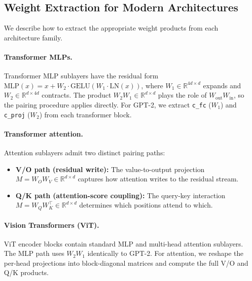 \documentclass[wcp]{jmlr}
\begin{document}
\subsection{Weight Extraction for Modern Architectures}\label{sec:architectures}

We describe how to extract the appropriate weight products from each architecture family.

\paragraph{Transformer MLPs.} Transformer MLP sublayers have the residual form $\mathrm{MLP}(x) = x + W_2 \cdot \mathrm{GELU}(W_1 \cdot \mathrm{LN}(x))$, where $W_1 \in \mathbb{R}^{4d \times d}$ expands and $W_2 \in \mathbb{R}^{d \times 4d}$ contracts. The product $W_2 W_1 \in \mathbb{R}^{d \times d}$ plays the role of $W_{\mathrm{out}} W_{\mathrm{in}}$, so the pairing procedure applies directly. For GPT-2, we extract \texttt{c\_fc} ($W_1$) and \texttt{c\_proj} ($W_2$) from each transformer block.

\paragraph{Transformer attention.} Attention sublayers admit two distinct pairing paths:
\begin{itemize}[leftmargin=*,itemsep=2pt]
  \item \textbf{V/O path (residual write):} The value-to-output projection $M = W_O W_V \in \mathbb{R}^{d \times d}$ captures how attention writes to the residual stream.
  \item \textbf{Q/K path (attention-score coupling):} The query-key interaction $M = W_Q W_K^\top \in \mathbb{R}^{d \times d}$ determines which positions attend to which.
\end{itemize}

\paragraph{Vision Transformers (ViT).} ViT encoder blocks contain standard MLP and multi-head attention sublayers. The MLP path uses $W_2 W_1$ identically to GPT-2. For attention, we reshape the per-head projections into block-diagonal matrices and compute the full V/O and Q/K products.
\end{document}
